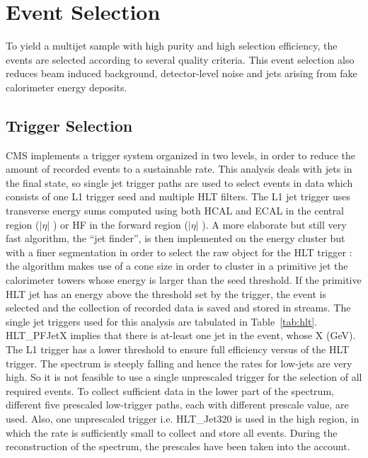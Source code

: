 \section{Event Selection}
To yield a multijet sample with high purity and high selection efficiency, the events are selected according to several quality criteria. This event selection also reduces beam induced background, detector-level noise and jets arising from fake calorimeter energy deposits. 

\subsection{Trigger Selection}

CMS implements a trigger system organized in two levels, in order to reduce the amount of recorded events to a sustainable rate. This analysis deals with jets in the final state, so single jet trigger paths are used to select events in data which consists of one L1 trigger seed and multiple HLT filters. The L1 jet trigger uses transverse energy sums computed using both HCAL and ECAL in the central region ($|\eta|$ ) or HF in the forward region ($|\eta|$ ). A more elaborate but still very fast algorithm, the ``jet finder'', is then implemented on the energy cluster but with a finer segmentation in order to select the raw object for the HLT trigger :  the algorithm makes use of a cone size in order to cluster in a primitive jet the calorimeter towers whose energy is larger than the seed threshold. If the primitive HLT jet has an energy above the threshold set by the trigger, the event is selected and the collection of recorded data is saved and stored in streams.  The single jet triggers used for this analysis are tabulated in Table~\ref{tab:hlt}. HLT\_PFJetX implies that there is at-least one jet in the event, whose \pt \gr X (GeV). The L1 trigger has a lower threshold to ensure full efficiency versus \pt of the HLT trigger. The \pt spectrum is steeply falling and hence the rates for low-\pt jets are very high. So it is not feasible to use a single unprescaled trigger for the selection of all required events. To collect sufficient data in the lower part of the \pt spectrum, different five prescaled low-\pt trigger paths, each with different prescale value, are used. Also, one unprescaled trigger i.e. HLT\_Jet320 is used in the high \pt region, in which the rate is sufficiently small to collect and store all events. During the reconstruction of the spectrum, the prescales have been taken into the account.

